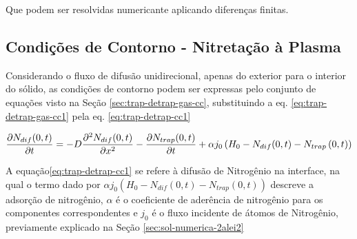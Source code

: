 Que podem ser resolvidas numericante aplicando diferenças finitas.

\subsection{Condições de Contorno - Nitretação à Plasma}
\label{sec:trap-detrap-plasma-cc}

Considerando o fluxo de difusão unidirecional, apenas do exterior para o interior do sólido, as condições de contorno podem ser expressas pelo conjunto de equações visto na Seção \ref{sec:trap-detrap-gas-cc}, substituindo a eq. \ref{eq:trap-detrap-gas-cc1} pela eq. \ref{eq:trap-detrap-cc1}

\begin{equation}
\label{eq:trap-detrap-cc1}
\pdv{N_{dif}(0,t)}{t} = -D\pdv[2]{N_{dif}(0,t)}{x} - \pdv{N_{trap}(0,t)}{t}  +\alpha j_{0}\left(H_0-N_{dif}(0,t)-N_{trap}\left(0,t\right)\right)
\end{equation}


A equação\autoref{eq:trap-detrap-cc1} se refere à difusão de Nitrogênio na interface, na qual o termo dado por $\alpha j_{0}\left(H_0-N_{dif}(0,t)-N_{trap}\left(0,t\right)\right)$ descreve a adsorção de nitrogênio, $\alpha$ é o coeficiente de aderência de nitrogênio para os componentes correspondentes  e  $j_0$ é o fluxo incidente de átomos de Nitrogênio, previamente explicado na Seção \autoref{sec:sol-numerica-2alei2}

